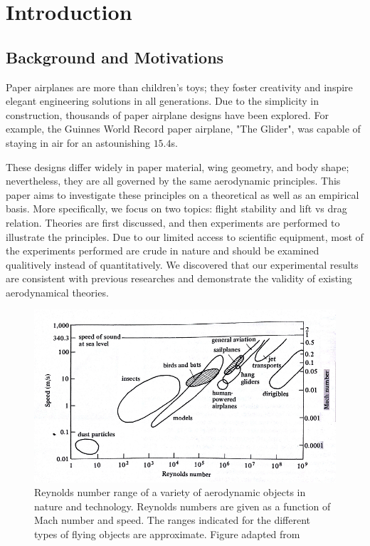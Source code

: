 \section{Introduction}

\subsection{Background and Motivations}
Paper airplanes are more than children's toys; they foster creativity and inspire elegant engineering solutions in all generations. 
Due to the simplicity in construction, thousands of paper airplane designs have been explored. For example, the Guinnes World Record 
paper airplane, "The Glider",  was capable of staying in air for an astounishing $15.4$s.  

These designs differ widely in paper material, wing geometry, 
and body shape; nevertheless, they are all governed by the same aerodynamic principles. This paper aims to investigate these principles
 on a theoretical as well as an empirical basis. More specifically, we focus on two topics: flight stability and lift vs drag relation. 
Theories are first discussed, and then experiments are performed to illustrate the principles. Due to our limited access to scientific 
equipment, most of the experiments performed are crude in nature and should be examined qualitively instead of quantitatively. We discovered
that our experimental results are consistent with previous researches and demonstrate the validity of existing aerodynamical theories.

\begin{figure}[hl]
	\centering
		\includegraphics[scale=0.8]{figures/reynoldsrange.png}
		\caption{Reynolds number range of a variety of aerodynamic objects in nature and technology. Reynolds numbers are given as a function of Mach number and speed. The ranges indicated for the different types of flying objects are approximate. Figure adapted from \cite{wegener}}
	\label{fig:reynoldsrange}
\end{figure}


